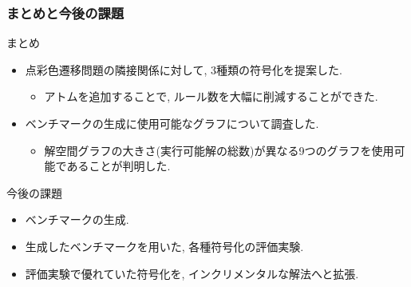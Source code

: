 \documentclass[dvipdfmx,11pt]{beamer}
\begin{document}
\begin{frame}\frametitle{まとめと今後の課題}

  \begin{block}{まとめ}
    \begin{itemize}
      \item 点彩色遷移問題の隣接関係に対して, 3種類の符号化を提案した.
      \begin{itemize}
        \item アトムを追加することで, ルール数を大幅に削減することができた.
      \end{itemize}
      \item ベンチマークの生成に使用可能なグラフについて調査した.
      \begin{itemize}
        \item 解空間グラフの大きさ(実行可能解の総数)が異なる9つのグラフを使用可能であることが判明した.
      \end{itemize}
    \end{itemize}
  \end{block}
  
  \begin{alertblock}{今後の課題}
    \begin{itemize}
      \item ベンチマークの生成.
      \item 生成したベンチマークを用いた, 各種符号化の評価実験.
      \item 評価実験で優れていた符号化を, インクリメンタルな解法へと拡張.
    \end{itemize}
  \end{alertblock}

\end{frame}



\end{document}
